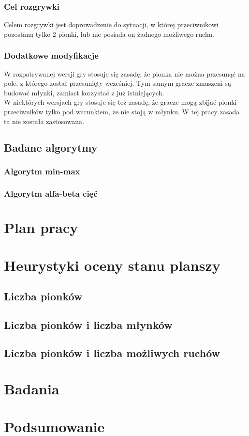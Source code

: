 \documentclass{article}
\begin{document}
	\subsubsection{Cel rozgrywki}
	Celem rozgrywki jest doprowadzenie do sytuacji, w której przeciwnikowi pozostaną tylko 2 pionki, lub nie posiada on żadnego możliwego ruchu.
	\subsubsection{Dodatkowe modyfikacje}
	W rozpatrywanej wersji gry stosuje się zasadę, że pionka nie można przesunąć na pole, z którego został przesunięty wcześniej. Tym samym gracze zmuszeni są budować młynki, zamiast korzystać z już istniejących.\\
	W niektórych wersjach gry stosuje się też zasadę, że gracze mogą zbijać pionki przeciwników tylko pod warunkiem, że nie stoją w młynku. W tej pracy zasada ta nie została zastosowana.
	\subsection{Badane algorytmy}
	\subsubsection{Algorytm min-max}
	\subsubsection{Algorytm alfa-beta cięć}
	\section{Plan pracy}
	
	\section{Heurystyki oceny stanu planszy}
	\subsection{Liczba pionków}
	\subsection{Liczba pionków i liczba młynków}
	\subsection{Liczba pionków i liczba możliwych ruchów}
	\section{Badania}
	\section{Podsumowanie}
\end{document}
